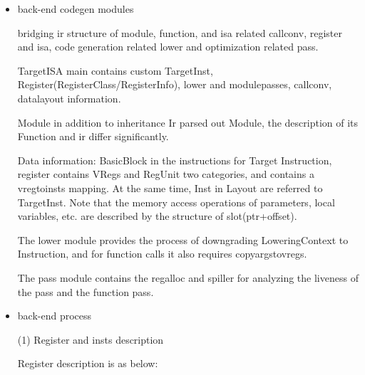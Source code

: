 \begin{itemize}
        \item back-end codegen modules

bridging ir structure of module, function, and isa related callconv, register and isa, code generation related lower and optimization related pass.

TargetISA main contains custom TargetInst, Register(RegisterClass/RegisterInfo), lower and modulepasses, callconv, datalayout information.

Module in addition to inheritance Ir parsed out Module, the description of its Function and ir differ significantly.

Data information: BasicBlock in the instructions for Target Instruction, register contains VRegs and RegUnit two categories, and contains a vregtoinsts mapping.
At the same time, Inst in Layout are referred to TargetInst. Note that the memory access operations of parameters, local variables, etc. are described by the structure of slot(ptr+offset).

The lower module provides the process of downgrading LoweringContext to Instruction, and for function calls it also requires copyargstovregs.

The pass module contains the regalloc and spiller for analyzing the liveness of the pass and the function pass.

        \item back-end process

(1) Register and insts description

Register description is as below:
\begin{table}[!ht]
    \caption{Register Description}
    \label{table:register-description}
\end{table}


\end{itemize}
